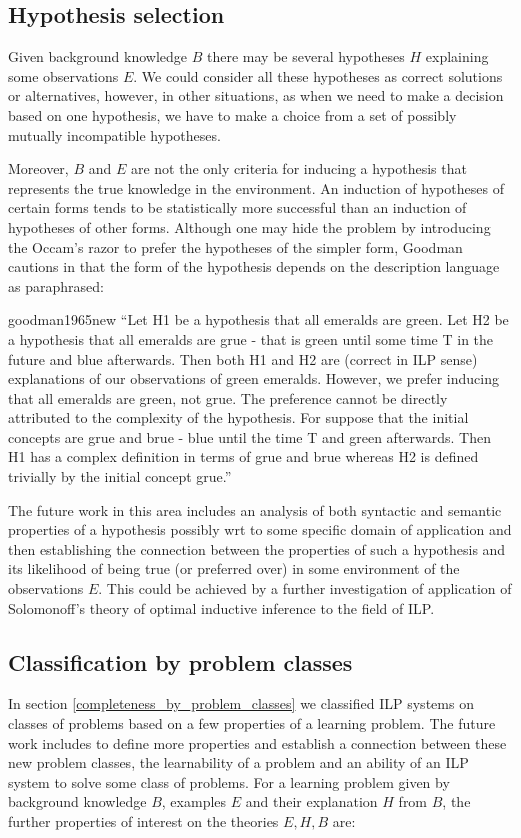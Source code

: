 \subsection{Hypothesis selection}
Given background knowledge $B$ there may be several hypotheses $H$ explaining some observations $E$. We could consider all these hypotheses as correct solutions or alternatives, however, in other situations, as when we need to make a decision based on one hypothesis, we have to make a choice from a set of possibly mutually incompatible hypotheses.

Moreover, $B$ and $E$ are not the only criteria for inducing a hypothesis that represents the true knowledge in the environment.
An induction of hypotheses of certain forms tends to be statistically more successful than an induction of hypotheses of other forms.
Although one may hide the problem by introducing the Occam's razor to prefer the hypotheses of the simpler form, Goodman cautions in \cite{goodman1965new} that the form of the hypothesis depends on the description language as paraphrased:

\begin{cite}{goodman1965new}
``Let H1 be a hypothesis that all emeralds are green. Let H2 be a hypothesis that all emeralds are grue - that is green until some time T in the future and blue afterwards. Then both H1 and H2 are (correct in ILP sense) explanations of our observations of green emeralds. However, we prefer inducing that all emeralds are green, not grue. The preference cannot be directly attributed to the complexity of the hypothesis. For suppose that the initial concepts are grue and brue - blue until the time T and green afterwards. Then H1 has a complex definition in terms of grue and brue whereas H2 is defined trivially by the initial concept grue.''
\end{cite}

The future work in this area includes an analysis of both syntactic and semantic properties of a hypothesis possibly wrt to some specific domain of application and then establishing the connection between the properties of such a hypothesis and its likelihood of being true (or preferred over) in some environment of the observations $E$. This could be achieved by a further investigation of application of Solomonoff's theory of optimal inductive inference\cite{solomonoff1964formal}\cite{legg1997solomonoff}
 to the field of ILP.

\subsection{Classification by problem classes}
In section \ref{completeness_by_problem_classes} we classified ILP systems on classes of problems based on a few properties of a learning problem. The future work includes to define more properties and establish a connection between these new problem classes, the learnability of a problem and an ability of an ILP system to solve some class of problems. For a learning problem given by background knowledge $B$, examples $E$ and their explanation $H$ from $B$, the further properties of interest on the theories $E, H, B$ are:

